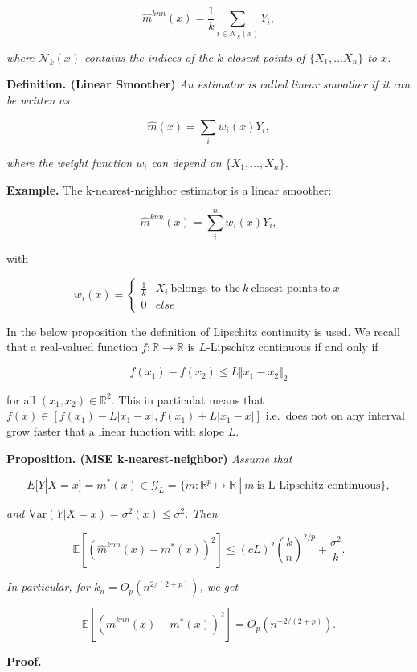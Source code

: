 \documentclass[a4paper,12pt,openany]{book}
\begin{document}
\[
\hat m^{knn}(x)= \frac 1 k \sum_{i \in \mathcal N_k(x)}Y_i,
\]

\emph{where \(\mathcal N_k(x)\) contains the indices of the \(k\) closest points of \(\{X_1, \dots X_n\}\) to \(x\).}

\textbf{Definition. (Linear Smoother)} \emph{An estimator is called linear smoother if it can be written as }

\[
\hat m(x)= \sum_i w_i(x)Y_i,
\]

\emph{where the weight function \(w_i\) can depend on \(\{X_1, \dots, X_n\}\).}

\textbf{Example.} The k-nearest-neighbor estimator is a linear smoother:

\[
\hat m^{knn}(x)= \sum_i^n w_i(x) Y_i,
\]

with

\[
w_i(x)=\begin{cases}\frac 1 k & X_i \ \text{belongs to the}\  k \ \text{closest points to}\  x \\ 0 & else\end{cases}
\]

In the below proposition the definition of Lipschitz continuity is used. We recall that a real-valued function \(f:\mathbb R\to\mathbb R\) is \(L\)-Lipschitz continuous if and only if

\[
f(x_1)-f(x_2)\le L\Vert x_1-x_2\Vert_2
\]

for all \((x_1,x_2)\in\mathbb R^2\). This in particulat means that \(f(x)\in[f(x_1)-L\vert x_1-x\vert,f(x_1)+L\vert x_1-x\vert]\) i.e.~does not on any interval grow faster that a linear function with slope \(L\).

\textbf{Proposition. (MSE k-nearest-neighbor)} \emph{Assume that}

\[
E[Y|X=x]=m^\ast(x)\in \mathcal G_L = \{m: \mathbb R^p \mapsto \mathbb R\ |\ m \ \text{is L-Lipschitz continuous}\},
\]

\emph{and \(\textrm{Var}(Y|X=x)=\sigma^2(x)\leq \sigma^2.\) Then }

\[
\mathbb E[(\hat m^{knn}(x)-m^\ast(x))^2]\leq (cL)^2 \left(\frac k n \right)^{2/p}+\frac {\sigma^2}k.
\]

\emph{In particular, for \(k_n=O_p( n^{2/(2+p)})\), we get }

\[
\mathbb E[(\hat m^{knn}(x)-m^\ast(x))^2]=O_p(n^{-2/(2+p)}).
\]

\textbf{Proof.}
\end{document}
